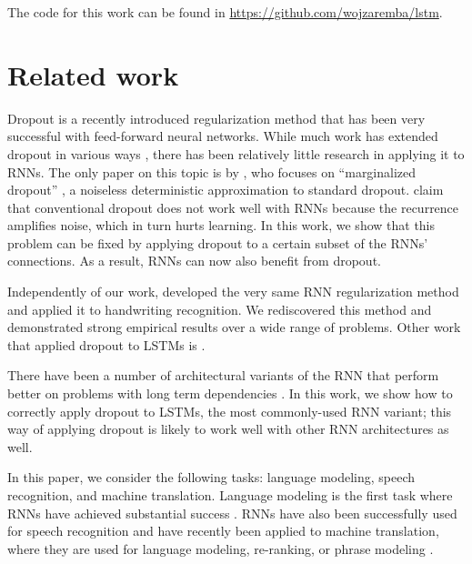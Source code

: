 \documentclass{article}
\begin{document}
The code for this work can be found in \url{https://github.com/wojzaremba/lstm}.

\section{Related work}

Dropout \cite{srivastava2013improving} is a recently introduced
regularization method that has been very successful with
feed-forward neural networks.   While much work has extended dropout in  
various ways \cite{wang2013fast,wan2013regularization}, there has
been relatively little research in applying it to RNNs. The only
paper on this topic is by \citet{bayer2013fast}, who focuses on
``marginalized dropout'' \cite{wang2013fast}, a
noiseless deterministic approximation to standard dropout.
\citet{bayer2013fast} claim that conventional dropout does not work well
with RNNs because the recurrence amplifies noise, which in turn hurts learning. 
In this work, we show that this problem can be fixed by
applying dropout to a certain subset of the RNNs' connections.  As a result, RNNs
can now also benefit from dropout.




Independently of our work, \cite{pham2013dropout} developed the very same RNN 
regularization method and applied it to handwriting recognition.  We rediscovered
this method and demonstrated strong empirical results over a wide range of problems. 
Other work that applied dropout to LSTMs is \cite{pachitariu2013regularization}.

There have been a number of architectural variants of the RNN that
perform better on problems with long term dependencies
\cite{hochreiter1997long, graves2009novel, cho2014learning,
  jaeger2007optimization, koutnik2014clockwork, sundermeyer2012lstm}.  In this work, we
show how to correctly apply dropout to LSTMs, the most
commonly-used RNN variant; this way of applying dropout is likely to
work well with other RNN architectures as well. 

In this paper, we consider the following tasks: language modeling,
speech recognition, and machine translation.  Language modeling is the
first task where RNNs have achieved substantial success
\cite{mikolov2010recurrent, mikolov2011strategies,
  pascanu2013construct}.  RNNs have also been successfully used for
speech recognition \cite{robinson1996use, graves2013speech} and have
recently been applied to machine translation, where they are 
used for language modeling, re-ranking, or phrase modeling
\cite{devlin14,kal13,cho2014learning,chow1987byblos,mikolov2013exploiting}.
\end{document}
